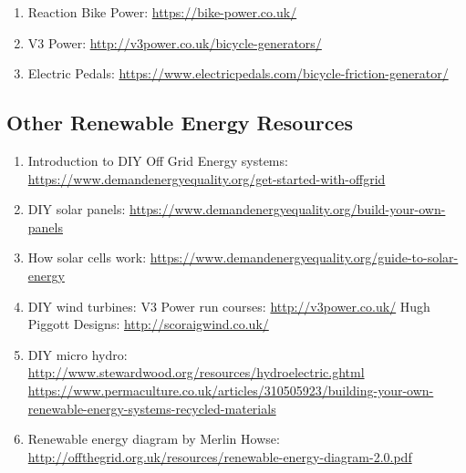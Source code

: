 \documentclass{article}
\theoremstyle{definition}
\theoremstyle{definition}
\theoremstyle{remark}
\begin{document}
    \begin{enumerate}[resume]
      \item Reaction Bike Power: \href{https://bike-power.co.uk/}{https://bike-power.co.uk/}
      \item V3 Power: \href{http://v3power.co.uk/bicycle-generators/}{http://v3power.co.uk/bicycle-generators/}
      \item Electric Pedals: \href{https://www.electricpedals.com/bicycle-friction-generator/}{https://www.electricpedals.com/bicycle-friction-generator/}
    \end{enumerate}
  

  \subsection{Other Renewable Energy Resources} %
  \label{sub:other_renewable_energy_resources}

    \begin{enumerate}[resume]
      \item Introduction to DIY Off Grid Energy systems: \newline
        \href{https://www.demandenergyequality.org/get-started-with-offgrid}{https://www.demandenergyequality.org/get-started-with-offgrid}
      \item DIY solar panels: \href{https://www.demandenergyequality.org/build-your-own-panels}{https://www.demandenergyequality.org/build-your-own-panels}
      \item How solar cells work: \href{https://www.demandenergyequality.org/guide-to-solar-energy}{https://www.demandenergyequality.org/guide-to-solar-energy}
      \item DIY wind turbines: \newline
        V3 Power run courses: \href{http://v3power.co.uk/}{http://v3power.co.uk/} \newline
        Hugh Piggott Designs: \href{http://scoraigwind.co.uk/}{http://scoraigwind.co.uk/}
      \item DIY micro hydro:  \href{http://www.stewardwood.org/resources/hydroelectric.ghtml}{http://www.stewardwood.org/resources/hydroelectric.ghtml} \newline
        \href{https://www.permaculture.co.uk/articles/310505923/building-your-own-renewable-energy-systems-recycled-materials}{https://www.permaculture.co.uk/articles/310505923/building-your-own-renewable-energy-systems-recycled-materials}
      \item Renewable energy diagram by Merlin Howse: \newline
        \href{http://offthegrid.org.uk/resources/renewable-energy-diagram-2.0.pdf}{http://offthegrid.org.uk/resources/renewable-energy-diagram-2.0.pdf}

    \end{enumerate}
  
\end{document}

